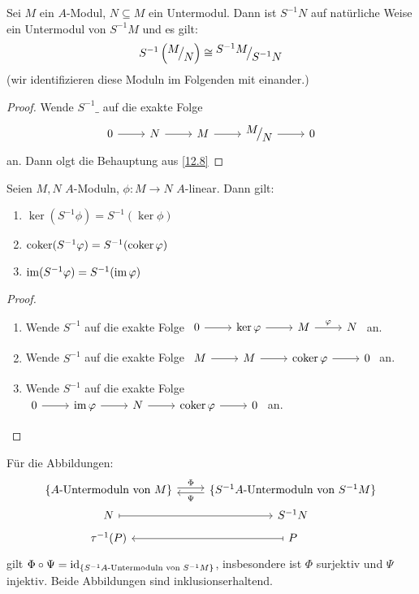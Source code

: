 \begin{fo} \label{12.9}
Sei $M$ ein $A$-Modul, $N\subseteq M$ ein Untermodul. Dann ist $S^{-1}N$ auf natürliche Weise ein Untermodul von $S^{-1}M$ und es gilt: 
$$S^{-1} \left(\QR{M}{N}\right) \cong \QR{S^{-1}M}{S^{-1}N}$$
(wir identifizieren diese Moduln im Folgenden mit einander.)
\end{fo}
\begin{proof}
Wende $S^{-1}\_$ auf die exakte Folge 
$$\begin{tikzcd}
0 \arrow{r} & N \arrow{r} & M \arrow{r} & \QR{M}{N} \arrow{r} & 0
\end{tikzcd}$$
an. Dann olgt die Behauptung aus \ref{12.8}
\end{proof}
\begin{bem}\label{12.10}
Seien $M,N$ $A$-Moduln, $\phi:M \to N$ $A$-linear. Dann gilt:
\begin{enumerate}[label= \alph*)]
	\item $\ker(S^{-1}\phi) = S^{-1}(\ker \phi)$
	\item $\operatorname{coker}(S^{-1}\varphi) = S^{-1}(\operatorname{coker}\varphi)$
	\item $\operatorname{im}(S^{-1}\varphi) = S^{-1}(\operatorname{im} \varphi)$
\end{enumerate}
\end{bem}
\begin{proof}
\begin{enumerate}[label= \alph*]
	\item Wende $S^{-1}$ auf die exakte Folge $\begin{tikzcd}
	0 \arrow{r} & \ker \phi \arrow{r} & M \arrow{r}{\phi}& N
	\end{tikzcd}$ an.
	\item Wende $S^{-1}$ auf die exakte Folge $\begin{tikzcd}
	M \arrow{r} & M  \arrow{r} & \coker \phi \arrow{r}& 0
	\end{tikzcd}$ an.
	\item Wende $S^{-1}$ auf die exakte Folge $\begin{tikzcd}
	0 \arrow{r} & \im \phi \arrow{r} & N \arrow{r}& \coker \phi \arrow{r} & 0
	\end{tikzcd}$ an.
\end{enumerate}
\end{proof}
\begin{bem}\label{12.11}
Für die Abbildungen:
$$\begin{tikzcd}[row sep = tiny]
\{A\text{-Untermoduln von } M\} \arrow[yshift = 0.5ex]{r}{\Phi} & \{S^{-1}A\text{-Untermoduln von } S^{-1}M\} \arrow[yshift = -0.5ex]{l}{\Psi} \\
N \arrow[mapsto]{r}& S^{-1}N \\
\tau^{-1}(P) & P\arrow[mapsto]{l} 
\end{tikzcd}$$
gilt $\Phi \circ \Psi = \operatorname{id}_{\{S^{-1}A\text{-Untermoduln von } S^{-1}M\}}$, insbesondere ist $\Phi$ surjektiv und $\Psi$ injektiv. Beide Abbildungen sind inklusionserhaltend.
\end{bem}
